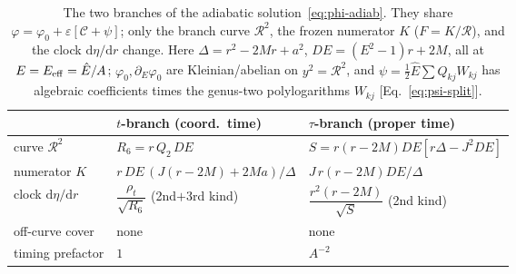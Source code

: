 \documentclass[12pt]{iopart}
\newcommand{\Ehat}{\hat E}
\newcommand{\dd}{\mathrm{d}}
\begin{document}
\begin{table}[htbp]
    \centering
    \caption{The two branches of the adiabatic solution~\eqref{eq:phi-adiab}. They
    share $\varphi=\varphi_0+\varepsilon[\mathcal{C}+\psi]$;
    only the branch curve $\mathcal{R}^2$, the frozen numerator $K$
    ($F=K/\mathcal{R}$), and the clock $\dd\eta/\dd r$ change. Here
    $\Delta=r^2-2Mr+a^2$, $DE=(E^2-1)r+2M$, all at $E=E_{\rm eff}=\Ehat/A$;
    $\varphi_0,\partial_E\varphi_0$ are Kleinian/abelian on $y^2=\mathcal{R}^2$, and
    $\psi=\tfrac12\Ehat\sum Q_{kj}W_{kj}$ has algebraic coefficients times the
    genus-two polylogarithms $W_{kj}$ [Eq.~\eqref{eq:psi-split}].}
    \label{tab:branch-adiab}
    \begin{tabular}{lll}
        \hline\hline
         & $t$-branch (coord.\ time) & $\tau$-branch (proper time)\\
        \hline
        curve $\mathcal{R}^2$ & $R_6=r\,Q_2\,DE$ & $S=r(r{-}2M)DE[r\Delta{-}J^2DE]$\\
        numerator $K$ & $r\,DE\,(J(r{-}2M){+}2Ma)/\Delta$ & $J\,r(r{-}2M)DE/\Delta$\\
        clock $\dd\eta/\dd r$ & $\dfrac{\rho_t}{\sqrt{R_6}}$ (2nd$+$3rd kind)
            & $\dfrac{r^2(r-2M)}{\sqrt{S}}$ (2nd kind)\\[4pt]
        off-curve cover & none & none\\
        timing prefactor & $1$ & $A^{-2}$\\
        \hline\hline
    \end{tabular}
\end{table}
\end{document}

